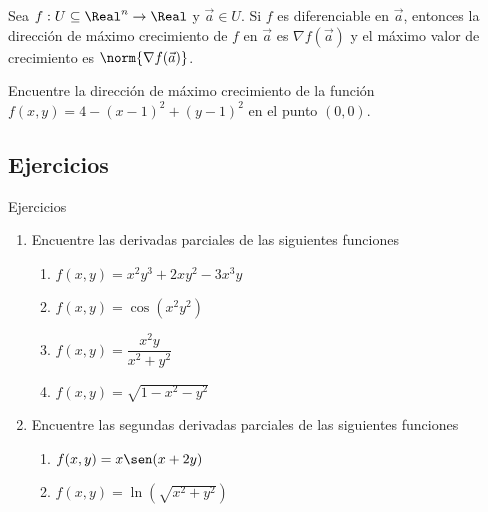\begin{frame}
  \begin{thm}
    Sea $f:U\subseteq\Real^n\to\Real$ y $\vec{a}\in U$. Si $f$ es diferenciable en $\vec{a}$, entonces la dirección de máximo crecimiento de $f$ en $\vec{a}$ es $\nabla f(\vec{a})$ y el máximo valor de crecimiento es $\norm{\nabla f(\vec{a})}$.
  \end{thm}
\end{frame}

\begin{frame}
  \begin{eg}
    Encuentre la dirección de máximo crecimiento de la función $f(x,y)=4-(x-1)^2+(y-1)^2$ en el punto $(0,0)$. 
  \end{eg}
\end{frame}

\subsection{Ejercicios}
\begin{frame}
\subsectionpage
\end{frame}


\begin{frame}{Ejercicios}
  \begin{enumerate}
    \item Encuentre las derivadas parciales de las siguientes funciones\\[0.25cm]
      \begin{enumerate}
        \item $f(x,y)=x^2y^3+2xy^2-3x^3y$
        \item $f(x,y)=\cos(x^2y^2)$
        \item $f(x,y)=\dfrac{x^2y}{x^2+y^2}$
        \item $f(x,y)=\sqrt{1-x^2-y^2}$
      \end{enumerate}
    \vspace{0.5cm}
    \item Encuentre las segundas derivadas parciales de las siguientes funciones\\[0.25cm]
      \begin{enumerate}
        \item $f(x,y)=x\sen(x+2y)$
        \item $f(x,y)=\ln(\sqrt{x^2+y^2})$
      \end{enumerate}
  \end{enumerate}
\end{frame}

